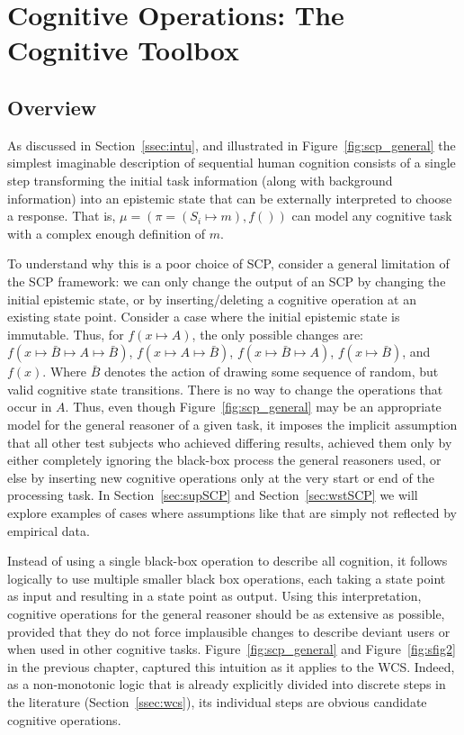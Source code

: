 \chapter{Cognitive Operations: The Cognitive Toolbox} \label{chp:toolbox}
\section{Overview}
As discussed in Section~\ref{ssec:intu}, and illustrated in Figure~\ref{fig:scp_general} the simplest imaginable description of sequential human cognition consists of a single step transforming the initial task information (along with background information) into an epistemic state that can be externally interpreted to choose a response. That is, $\mu=(\pi=(S_i \longmapsto m),f())$ can model any cognitive task with a complex enough definition of $m$.

To understand why this is a poor choice of SCP, consider a general limitation of the SCP framework: we can only change the output of an SCP by changing the initial epistemic state, or by inserting/deleting a cognitive operation at an existing state point. Consider a case where the initial epistemic state is immutable. Thus, for $f(x \longmapsto A)$, the only possible changes are: $f(x \longmapsto \bar{B} \longmapsto A \longmapsto \bar{B})$, $f(x \longmapsto A \longmapsto \bar{B})$, $f(x \longmapsto \bar{B} \longmapsto A)$, $f(x \longmapsto \bar{B})$, and $f(x)$. Where $\bar{B}$ denotes the action of drawing some sequence of random, but valid cognitive state transitions. There is no way to change the operations that occur in $A$. Thus, even though Figure~\ref{fig:scp_general} may be an appropriate model for the general reasoner of a given task, it imposes the implicit assumption that all other test subjects who achieved differing results, achieved them only by either completely ignoring the black-box process the general reasoners used, or else by inserting new cognitive operations only at the very start or end of the processing task. In Section~\ref{sec:supSCP} and Section~\ref{sec:wstSCP} we will explore examples of cases where assumptions like that are simply not reflected by empirical data. 

Instead of using a single black-box operation to describe all cognition, it follows logically to use multiple smaller black box operations, each taking a state point as input and resulting in a state point as output. Using this interpretation, cognitive operations for the general reasoner should be as extensive as possible, provided that they do not force implausible changes to describe deviant users or when used in other cognitive tasks. Figure~\ref{fig:scp_general} and Figure~\ref{fig:sfig2} in the previous chapter, captured this intuition as it applies to the WCS. Indeed, as a non-monotonic logic that is already explicitly divided into discrete steps in the literature (Section~\ref{ssec:wcs}), its individual steps are obvious candidate cognitive operations.

